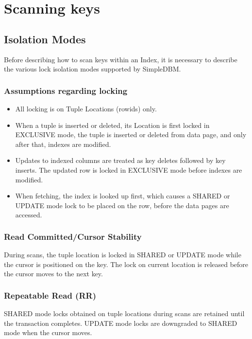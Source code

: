 \documentclass[a4paper,draft,oneside]{book}
\begin{document}
\section{Scanning keys}

\subsection{Isolation Modes}
\label{sec:isolationmodes}

Before describing how to scan keys within an Index, it is necessary to
describe the various lock isolation modes supported by SimpleDBM.

\subsubsection{Assumptions regarding locking}

\begin{itemize}
\item All locking is on Tuple Locations (rowids) only.
\item When a tuple is inserted or deleted, its Location is first
  locked in EXCLUSIVE mode, the tuple is inserted or deleted from data
  page, and only after that, indexes are modified.
\item Updates to indexed columns are treated as key deletes followed
  by key inserts. The updated row is locked in EXCLUSIVE mode before
  indexes are modified.
\item When fetching, the index is looked up first, which causes a
  SHARED or UPDATE mode lock to be placed on the row, before the data
  pages are accessed.
\end{itemize}

\subsubsection{Read Committed/Cursor Stability}

During scans, the tuple location is locked in SHARED or UPDATE mode
while the cursor is positioned on the key. The lock on current
location is released before the cursor moves to the next key.

\subsubsection{Repeatable Read (RR)}

SHARED mode locks obtained on tuple locations during scans are retained until
the transaction completes. UPDATE mode locks are downgraded to SHARED mode when
the cursor moves.
\end{document}
